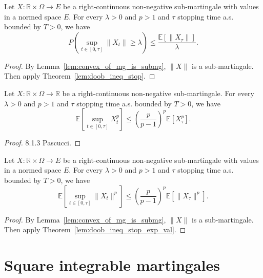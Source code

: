 \begin{corollary}\label{cor:doob_ineq_stop}
  Let $X:\mathbb{R}\times\Omega\rightarrow E$ be a right-continuous non-negative sub-martingale with values in a normed space $E$.
  For every $\lambda>0$ and $p>1$ and $\tau$ stopping time a.s. bounded by $T>0$, we have
  $$
  P\left( \sup_{t\in[0,\tau]}\lVert X_t \rVert \geq\lambda \right)\leq \frac{\mathbb{E}[\lVert X_\tau \rVert]}{\lambda}.
  $$
\end{corollary}
\begin{proof}
  By Lemma~\ref{lem:convex_of_mg_is_submg}, $\lVert X \rVert$ is a sub-martingale.
  Then apply Theorem~\ref{lem:doob_ineq_stop}.
\end{proof}

\begin{lemma}\label{lem:doob_ineq_stop_exp_val}
  Let $X:\mathbb{R}\times\Omega\rightarrow \mathbb{R}$ be a right-continuous non-negative sub-martingale.
  For every $\lambda>0$ and $p>1$ and $\tau$ stopping time a.s. bounded by $T>0$, we have
  $$
  \mathbb{E}\left[ \sup_{t\in[0,\tau]}X_t^p \right]\leq \left(\frac{p}{p-1}\right)^p\mathbb{E}[X_\tau^p].
  $$
\end{lemma}
\begin{proof}
  8.1.3 Pascucci.
\end{proof}

\begin{corollary}\label{cor:doob_ineq_stop_exp_val}
  Let $X:\mathbb{R}\times\Omega\rightarrow E$ be a right-continuous non-negative sub-martingale with values in a normed space $E$.
  For every $\lambda>0$ and $p>1$ and $\tau$ stopping time a.s. bounded by $T>0$, we have
  $$
  \mathbb{E}\left[ \sup_{t\in[0,\tau]}\lVert X_t \rVert^p \right]\leq \left(\frac{p}{p-1}\right)^p\mathbb{E}[\lVert X_\tau \rVert^p].
  $$
\end{corollary}
\begin{proof}
  By Lemma~\ref{lem:convex_of_mg_is_submg}, $\lVert X \rVert$ is a sub-martingale.
  Then apply Theorem~\ref{lem:doob_ineq_stop_exp_val}.
\end{proof}

\section{Square integrable martingales}

